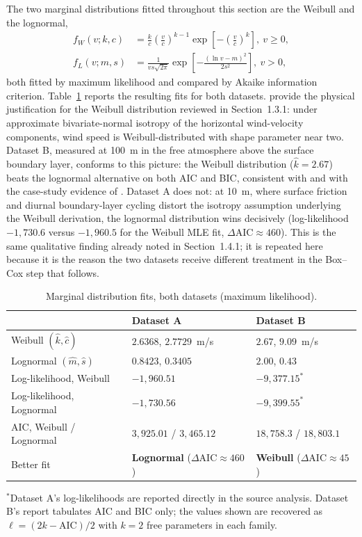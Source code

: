 \documentclass[11pt, a4paper, twoside]{article}
\begin{document}
The two marginal distributions fitted throughout this section are the Weibull and the lognormal,
\begin{align}
f_W(v;k,c) &= \frac{k}{c}\left(\frac{v}{c}\right)^{k-1}\exp\left[-\left(\frac{v}{c}\right)^k\right],\ v \geq 0, \\
f_L(v;m,s) &= \frac{1}{vs\sqrt{2\pi}}\exp\left[-\frac{(\ln v - m)^2}{2s^2}\right],\ v > 0,
\end{align}
both fitted by maximum likelihood and compared by Akaike information criterion. Table~\ref{tab:weibull-fit} reports the resulting fits for both datasets. \citet{TullerBrett1984} provide the physical justification for the Weibull distribution reviewed in Section~1.3.1: under approximate bivariate-normal isotropy of the horizontal wind-velocity components, wind speed is Weibull-distributed with shape parameter near two. Dataset B, measured at 100~m in the free atmosphere above the surface boundary layer, conforms to this picture: the Weibull distribution ($\hat k = 2.67$) beats the lognormal alternative on both AIC and BIC, consistent with \citet{TullerBrett1984} and with the case-study evidence of \citet{Garcia1998}. Dataset A does not: at 10~m, where surface friction and diurnal boundary-layer cycling distort the isotropy assumption underlying the Weibull derivation, the lognormal distribution wins decisively (log-likelihood $-1{,}730.6$ versus $-1{,}960.5$ for the Weibull MLE fit, $\Delta\text{AIC} \approx 460$). This is the same qualitative finding already noted in Section~1.4.1; it is repeated here because it is the reason the two datasets receive different treatment in the Box--Cox step that follows.

\begin{table}[htbp]
\centering
\small
\caption{Marginal distribution fits, both datasets (maximum likelihood).}
\label{tab:weibull-fit}
\begin{tabularx}{\textwidth}{l >{\raggedright\arraybackslash}X >{\raggedright\arraybackslash}X}
\toprule
& \textbf{Dataset A} & \textbf{Dataset B} \\
\midrule
Weibull $(\hat k, \hat c)$ & $2.6368$, $2.7729$~m/s & $2.67$, $9.09$~m/s \\
Lognormal $(\hat m, \hat s)$ & $0.8423$, $0.3405$ & $2.00$, $0.43$ \\
Log-likelihood, Weibull & $-1{,}960.51$ & $-9{,}377.15^{\ast}$ \\
Log-likelihood, Lognormal & $-1{,}730.56$ & $-9{,}399.55^{\ast}$ \\
AIC, Weibull / Lognormal & $3{,}925.01$ / $3{,}465.12$ & $18{,}758.3$ / $18{,}803.1$ \\
Better fit & \textbf{Lognormal} ($\Delta\text{AIC}\!\approx\!460$) & \textbf{Weibull} ($\Delta\text{AIC}\!\approx\!45$) \\
\bottomrule
\end{tabularx}
\vspace{2pt}
{\footnotesize $^{\ast}$Dataset A's log-likelihoods are reported directly in the source analysis. Dataset B's report tabulates AIC and BIC only; the values shown are recovered as $\ell = (2k - \mathrm{AIC})/2$ with $k = 2$ free parameters in each family.}
\end{table}
\end{document}
